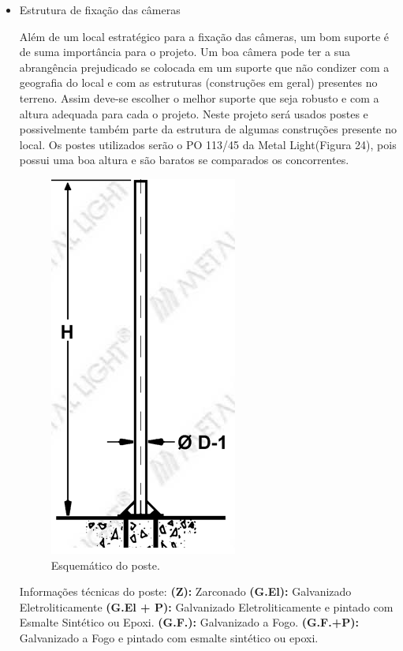 \begin{itemize}
	\item Estrutura de fixação das câmeras
	
	Além de um local estratégico para a fixação das câmeras, um bom suporte é de suma importância para o projeto. Um boa câmera pode ter a sua abrangência prejudicado se colocada em um suporte que não condizer com a geografia do local e com as estruturas (construções em geral) presentes no terreno. Assim deve-se escolher o melhor suporte que seja robusto e com a altura adequada para cada o projeto. Neste projeto será usados postes e possivelmente também parte da estrutura de algumas construções presente no local. Os postes utilizados serão o PO 113/45 da Metal Light(Figura 24), pois possui uma boa altura e são baratos se comparados os concorrentes.
	
	\begin{figure}[H]
	 \centering
	\label{Esquemático do poste}
	 \includegraphics[keepaspectratio=true,scale=0.8]{monitoramento/26.png}
	 \caption{Esquemático do poste.}
	\end{figure}	
	
	
	Informações técnicas do poste:
	{\bf(Z):} Zarconado
	{\bf(G.El):} Galvanizado Eletroliticamente
	{\bf(G.El + P):} Galvanizado Eletroliticamente e pintado com Esmalte Sintético ou Epoxi.
	{\bf(G.F.):} Galvanizado a Fogo.
	{\bf(G.F.+P):} Galvanizado a Fogo e pintado com esmalte sintético ou epoxi.
	

\end{itemize}
